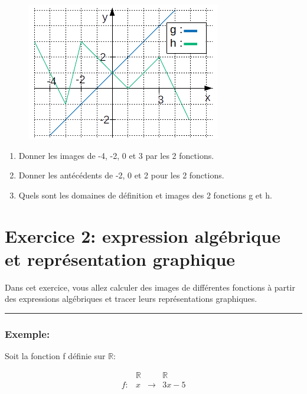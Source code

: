 \documentclass[11pt, french]{article}
\begin{document}
\begin{figure}[!h]
\center
\includegraphics[scale=0.9]{assets/serie_1_exo_1_figure_2.png}
\label{fig:p_s_1_exo1-fig2}
\end{figure}

\begin{enumerate}
    \item  Donner les images de -4, -2, 0 et 3 par les 2 fonctions.
    \item  Donner les antécédents de -2, 0 et 2 pour les 2 fonctions.
    \item  Quels sont les domaines de définition et images des 2 fonctions g et h.
\end{enumerate}
\vspace{3cm}

\section*{Exercice 2: expression algébrique et représentation graphique}
Dans cet exercice, vous allez calculer des images de différentes fonctions à partir des expressions algébriques et tracer leurs représentations graphiques.

\noindent\rule{\textwidth}{1pt}
\subsubsection*{Exemple:}
Soit la fonction f définie sur $\mathbb{R}$:

\begin{equation}\nonumber
\begin{matrix}
    & \mathbb{R}   &             & \mathbb{R} \\
f : &     x& \rightarrow & 3x-5 
\end{matrix}
\end{equation}
\end{document}
